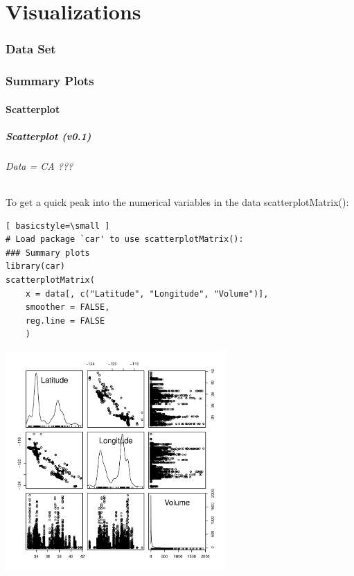 \part{Visualizations}

\section{Data Set}
\begin{frame}
\end{frame}


\section[Summary Plots]{Summary Plots}

\subsection{Scatterplot}
\begin{frame}
\frametitle{Scatterplot (v0.1)}
  \framesubtitle{Data = CA ???}

To get a quick peak into the numerical variables in the data \ttfamily scatterplotMatrix(): \normalfont
  		\begin{lstlisting}[ basicstyle=\small ]
# Load package `car' to use scatterplotMatrix():	
### Summary plots 
library(car)	
scatterplotMatrix(
	x = data[, c("Latitude", "Longitude", "Volume")], 
	smoother = FALSE, 
	reg.line = FALSE
	)
		\end{lstlisting}

        \begin{center}
         \includegraphics[width=0.63\textwidth]{images/scatterPlot_v0.pdf}
        \end{center}
\end{frame}

